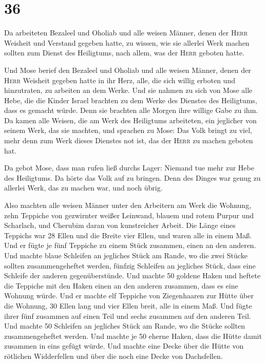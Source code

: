 \hypertarget{section-35}{%
\section{36}\label{section-35}}

 Da arbeiteten Bezaleel und Oholiab und alle weisen
Männer, denen der \textsc{Herr} Weisheit und Verstand gegeben hatte, zu
wissen, wie sie allerlei Werk machen sollten zum Dienst des Heiligtums,
nach allem, was der \textsc{Herr} geboten hatte.

 Und Mose berief den Bezaleel und Oholiab und alle weisen
Männer, denen der \textsc{Herr} Weisheit gegeben hatte in ihr Herz,
alle, die sich willig erboten und hinzutraten, zu arbeiten an dem Werke.
 Und sie nahmen zu sich von Mose alle Hebe, die die Kinder
Israel brachten zu dem Werke des Dienstes des Heiligtums, dass es
gemacht würde. Denn sie brachten alle Morgen ihre willige Gabe zu ihm.
 Da kamen alle Weisen, die am Werk des Heiligtums
arbeiteten, ein jeglicher von seinem Werk, das sie machten,
 und sprachen zu Mose: Das Volk bringt zu viel, mehr denn
zum Werk dieses Dienstes not ist, das der \textsc{Herr} zu machen
geboten hat.

 Da gebot Mose, dass man rufen ließ durchs Lager: Niemand
tue mehr zur Hebe des Heiligtums. Da hörte das Volk auf zu bringen.
 Denn des Dinges war genug zu allerlei Werk, das zu machen
war, und noch übrig.

 Also machten alle weisen Männer unter den Arbeitern am
Werk die Wohnung, zehn Teppiche von gezwirnter weißer Leinwand, blauem
und rotem Purpur und Scharlach, und Cherubim daran von kunstreicher
Arbeit.  Die Länge eines Teppichs war 28 Ellen und die
Breite vier Ellen, und waren alle in einem Maß.  Und er
fügte je fünf Teppiche zu einem Stück zusammen, einen an den anderen.
 Und machte blaue Schleifen an jegliches Stück am Rande,
wo die zwei Stücke sollten zusammengeheftet werden, 
fünfzig Schleifen an jegliches Stück, dass eine Schleife der anderen
gegenüberstünde.  Und machte 50 goldene Haken und heftete
die Teppiche mit den Haken einen an den anderen zusammen, dass es eine
Wohnung würde.  Und er machte elf Teppiche von
Ziegenhaaren zur Hütte über die Wohnung,  30 Ellen lang
und vier Ellen breit, alle in einem Maß.  Und fügte ihrer
fünf zusammen auf einen Teil und sechs zusammen auf den anderen Teil.
 Und machte 50 Schleifen an jegliches Stück am Rande, wo
die Stücke sollten zusammengeheftet werden.  Und machte
je 50 eherne Haken, dass die Hütte damit zusammen in eins gefügt würde.
 Und machte eine Decke über die Hütte von rötlichen
Widderfellen und über die noch eine Decke von Dachsfellen.

